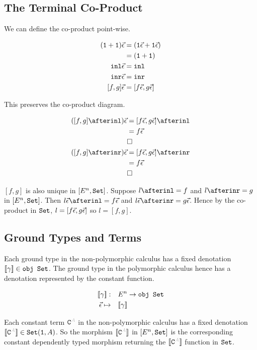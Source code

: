 \documentclass{report}
\begin{document}
\subsection{The Terminal Co-Product}

We can define the co-product point-wise.

\begin{align}
    (\texttt{1} + \texttt{1})\vec{\epsilon} & = (\texttt{1}\vec{\epsilon} + \texttt{1}\vec{\epsilon})\\
    & = (\texttt{1} + \texttt{1})\\
    \texttt{inl}\vec{\epsilon} &= \texttt{inl}\\
    \texttt{inr}\vec{\epsilon} &= \texttt{inr}\\
    [f, g]\vec{\epsilon} &= [f\vec{\epsilon}, g\vec{\epsilon}]\\
\end{align}

This preserves the co-product diagram.

\begin{align}
    ([f, g]\after\inl)\ev & = [f\ev, g\ev]\after \inl\\
    & = f\ev\\
    & \square\\
    ([f, g]\after\inr)\ev& = [f\ev, g\ev]\after \inr\\
    & = f\ev\\
    & \square\\
\end{align}

$[f, g]$ is also unique in $[E^n, \texttt{Set}]$. Suppose $l \after \inl = f$ and $l\after \inr = g$ in $[E^n, \texttt{Set}]$. Then $l\ev \after \inl = f\ev$ and $l\ev \after\inr = g\ev$. Hence by the co-product in $\texttt{Set}$, $l = [f\vec{\epsilon}, g\vec{\epsilon}]$ so $l = [f, g]$.


\subsection{Ground Types and Terms}
Each ground type in the non-polymorphic calculus has a fixed denotation ${\bf [\![}\gamma{\bf ]\!]}\in\texttt{obj }\texttt{Set}$. The ground type in the polymorphic calculus hence has a denotation represented by the constant function.

\begin{align}
    {\bf [\![}\gamma{\bf ]\!]}:&\quad E^n\rightarrow \texttt{obj }\texttt{Set}\\
    \vec{\epsilon} \mapsto&\quad  {\bf [\![}\gamma{\bf ]\!]}\\
\end{align}

Each constant term $\const{A}$ in the non-polymorphic calculus has a fixed denotation $\deno{\const{A}}\in\set(\1, A)$. So the morphism $\deno{\const{A}}$ in $[E^n, \texttt{Set}]$ is the corresponding constant dependently typed morphism returning the $\deno{\const{A}}$ function in $\texttt{Set}$.
\end{document}
